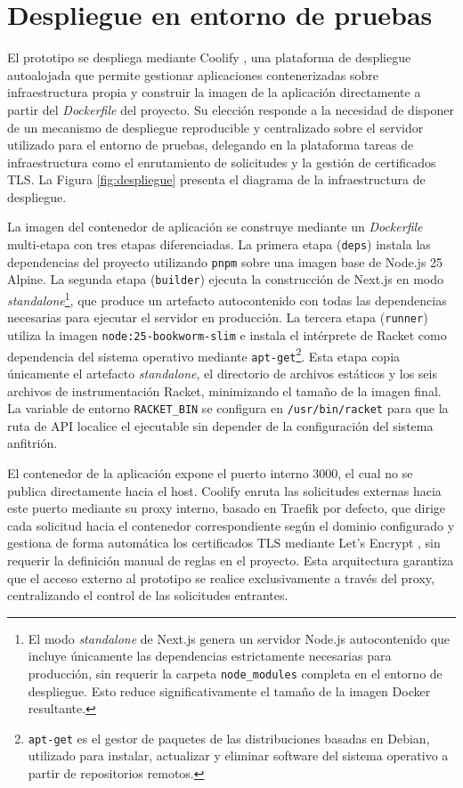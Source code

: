 \section{Despliegue en entorno de pruebas}

El prototipo se despliega mediante Coolify \cite{coolify}, una plataforma de despliegue autoalojada que permite gestionar aplicaciones contenerizadas sobre infraestructura propia y construir la imagen de la aplicación directamente a partir del \textit{Dockerfile} del proyecto. Su elección responde a la necesidad de disponer de un mecanismo de despliegue reproducible y centralizado sobre el servidor utilizado para el entorno de pruebas, delegando en la plataforma tareas de infraestructura como el enrutamiento de solicitudes y la gestión de certificados TLS. La Figura \ref{fig:despliegue} presenta el diagrama de la infraestructura de despliegue.

La imagen del contenedor de aplicación se construye mediante un \textit{Dockerfile} multi-etapa con tres etapas diferenciadas. La primera etapa (\texttt{deps}) instala las dependencias del proyecto utilizando \texttt{pnpm} sobre una imagen base de Node.js 25 Alpine. La segunda etapa (\texttt{builder}) ejecuta la construcción de Next.js en modo \textit{standalone}\footnote{El modo \textit{standalone} de Next.js genera un servidor Node.js autocontenido que incluye únicamente las dependencias estrictamente necesarias para producción, sin requerir la carpeta \texttt{node\_modules} completa en el entorno de despliegue. Esto reduce significativamente el tamaño de la imagen Docker resultante.}, que produce un artefacto autocontenido con todas las dependencias necesarias para ejecutar el servidor en producción. La tercera etapa (\texttt{runner}) utiliza la imagen \texttt{node:25-bookworm-slim} e instala el intérprete de Racket como dependencia del sistema operativo mediante \texttt{apt-get}\footnote{\texttt{apt-get} es el gestor de paquetes de las distribuciones basadas en Debian, utilizado para instalar, actualizar y eliminar software del sistema operativo a partir de repositorios remotos.}. Esta etapa copia únicamente el artefacto \textit{standalone}, el directorio de archivos estáticos y los seis archivos de instrumentación Racket, minimizando el tamaño de la imagen final. La variable de entorno \texttt{RACKET\_BIN} se configura en \texttt{/usr/bin/racket} para que la ruta de API localice el ejecutable sin depender de la configuración del sistema anfitrión.

El contenedor de la aplicación expone el puerto interno 3000, el cual no se publica directamente hacia el host. Coolify enruta las solicitudes externas hacia este puerto mediante su proxy interno, basado en Traefik por defecto, que dirige cada solicitud hacia el contenedor correspondiente según el dominio configurado y gestiona de forma automática los certificados TLS mediante Let's Encrypt \cite{coolify_traefik}, sin requerir la definición manual de reglas en el proyecto. Esta arquitectura garantiza que el acceso externo al prototipo se realice exclusivamente a través del proxy, centralizando el control de las solicitudes entrantes.

